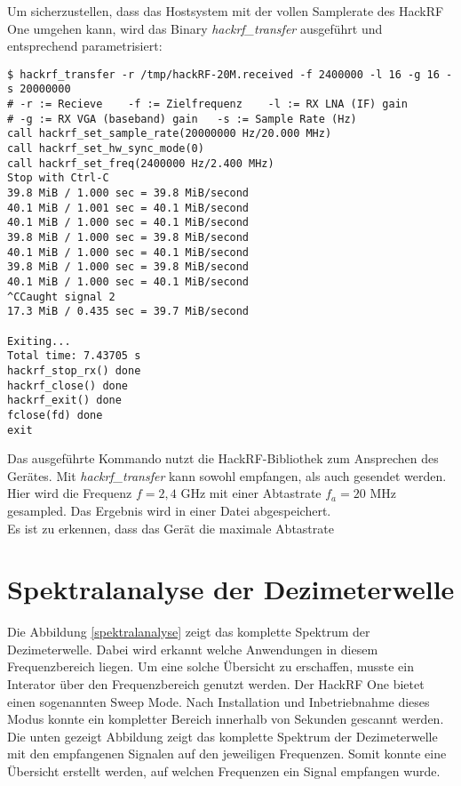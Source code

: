 \newpage
Um sicherzustellen, dass das Hostsystem mit der vollen Samplerate des HackRF One umgehen kann, wird das Binary \textit{hackrf\_transfer} ausgeführt und entsprechend parametrisiert:

\begin{lstlisting}[caption=Empfangen von Daten mit hackrf\_transfer, label=hackrf-receive]
$ hackrf_transfer -r /tmp/hackRF-20M.received -f 2400000 -l 16 -g 16 -s 20000000
# -r := Recieve    -f := Zielfrequenz    -l := RX LNA (IF) gain    
# -g := RX VGA (baseband) gain   -s := Sample Rate (Hz)
call hackrf_set_sample_rate(20000000 Hz/20.000 MHz)
call hackrf_set_hw_sync_mode(0)
call hackrf_set_freq(2400000 Hz/2.400 MHz)
Stop with Ctrl-C
39.8 MiB / 1.000 sec = 39.8 MiB/second
40.1 MiB / 1.001 sec = 40.1 MiB/second
40.1 MiB / 1.000 sec = 40.1 MiB/second
39.8 MiB / 1.000 sec = 39.8 MiB/second
40.1 MiB / 1.000 sec = 40.1 MiB/second
39.8 MiB / 1.000 sec = 39.8 MiB/second
40.1 MiB / 1.000 sec = 40.1 MiB/second
^CCaught signal 2
17.3 MiB / 0.435 sec = 39.7 MiB/second

Exiting...
Total time: 7.43705 s
hackrf_stop_rx() done
hackrf_close() done
hackrf_exit() done
fclose(fd) done
exit
\end{lstlisting}

Das ausgeführte Kommando nutzt die HackRF-Bibliothek zum Ansprechen des Gerätes. 
Mit \textit{hackrf\_transfer} kann sowohl empfangen, als auch gesendet werden. 
Hier wird die Frequenz \(f = 2,4\) GHz mit einer Abtastrate  \( f_a = 20 \) MHz gesampled.
Das Ergebnis wird in einer Datei abgespeichert. \\
Es ist zu erkennen, dass das Gerät die maximale Abtastrate

\newpage
\section{Spektralanalyse der Dezimeterwelle}
Die Abbildung \ref{spektralanalyse} zeigt das komplette Spektrum der Dezimeterwelle. Dabei wird erkannt welche Anwendungen in diesem Frequenzbereich liegen. Um eine solche Übersicht zu erschaffen, musste ein Interator über den Frequenzbereich genutzt werden. Der HackRF One bietet einen sogenannten Sweep Mode. Nach Installation und Inbetriebnahme dieses Modus konnte ein kompletter Bereich innerhalb von Sekunden gescannt werden. Die unten gezeigt Abbildung zeigt das komplette Spektrum der Dezimeterwelle mit den empfangenen Signalen auf den jeweiligen Frequenzen. Somit konnte eine Übersicht erstellt werden, auf welchen Frequenzen ein Signal empfangen wurde.\\

